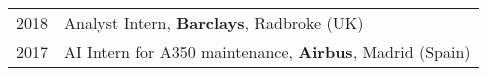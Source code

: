 
\begin{longtable}[l]{@{}p{} p{}}
    
    2018 & Analyst Intern, \textbf{Barclays}, Radbroke (UK) \\
    2017 & AI Intern for A350 maintenance, \textbf{Airbus}, Madrid (Spain)

\end{longtable}